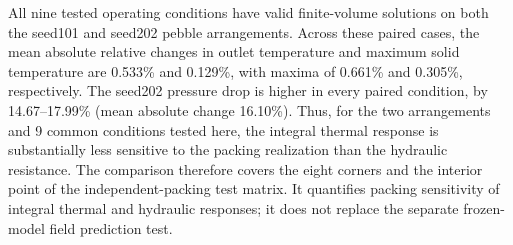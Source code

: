 All nine tested operating conditions have valid finite-volume solutions on both the seed101 and seed202 pebble arrangements. Across these paired cases, the mean absolute relative changes in outlet temperature and maximum solid temperature are 0.533\% and 0.129\%, with maxima of 0.661\% and 0.305\%, respectively. The seed202 pressure drop is higher in every paired condition, by 14.67--17.99\% (mean absolute change 16.10\%). Thus, for the two arrangements and 9 common conditions tested here, the integral thermal response is substantially less sensitive to the packing realization than the hydraulic resistance. The comparison therefore covers the eight corners and the interior point of the independent-packing test matrix. It quantifies packing sensitivity of integral thermal and hydraulic responses; it does not replace the separate frozen-model field prediction test.
